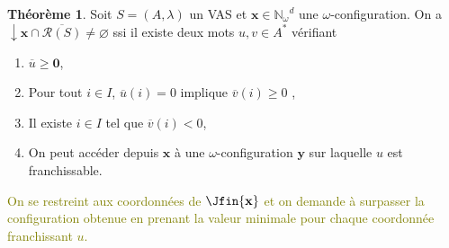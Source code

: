 \documentclass[a4paper,final]{article}
\theoremstyle{definition}
\newtheorem{Theorem}{Théorème}
\let\geq\geqslant
\newcommand{\lucas}[1]{\textcolor{olive}{#1}}
\let\inter\cap
\let\vide\varnothing
\newcommand{\Nomega}{\ensuremath{\mathbb{N}_\omega}}
\newcommand{\vect}[1]{\ensuremath{\mathbf{#1}}}
\newcommand{\valeur}[1]{\ensuremath{\overline{#1}}}
\newcommand{\inirat}{\mathcal{R}}
\begin{document}
\begin{Theorem}
Soit $S = (A,\lambda)$ un VAS et $\vect{x}\in\Nomega^d$ une $\omega$-configuration.
On a $\downarrow \vect{x} \inter \overline{\inirat(S)} \neq \vide$ ssi
il existe deux mots $u,v \in A^*$ vérifiant
\begin{enumerate}
    \item $\valeur{u} \geq \vect{0}$,
    \item Pour tout $i \in I$, $\valeur{u}(i)=0$ implique $\valeur{v}(i) \geq 0$ ,
    \item Il existe $i\in I$ tel que $\valeur{v}(i) < 0$,
    \item On peut accéder depuis $\vect{x}$ à une $\omega$-configuration $\vect{y}$ sur laquelle $u$ est franchissable.
\end{enumerate}

\lucas{On se restreint aux coordonnées de $\Jfin{\vect{x}}$ et on demande à surpasser la configuration obtenue en prenant la valeur minimale pour chaque coordonnée franchissant $u$.}
\end{Theorem}

\end{document}
